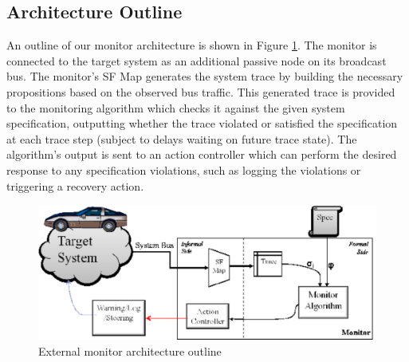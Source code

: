 \subsection{Architecture Outline}
An outline of our monitor architecture is shown in Figure \ref{fig:architecture}. 
The monitor is connected to the target system as an additional passive node on its broadcast bus. 
The monitor's \textsf{SF Map} generates the system trace by building the necessary propositions based on the observed bus traffic. 
%
This generated trace is provided to the monitoring algorithm which checks it against the given system specification, outputting whether the trace violated or satisfied the specification at each trace step (subject to delays waiting on future trace state).
The algorithm's output is sent to an action controller which can perform the desired response to any specification violations, such as logging the violations or triggering a recovery action.


\begin{figure}
\includegraphics[width=4.5in]{img/mon_arch}
\caption{External monitor architecture outline \label{fig:architecture}}
\end{figure}

